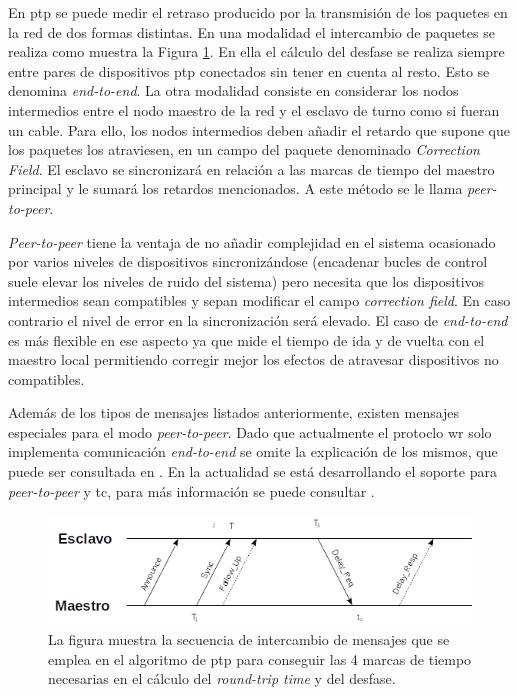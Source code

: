 En \gls{ptp} se puede medir el retraso producido por la transmisión de los 
paquetes en la red de dos formas distintas. En una modalidad el intercambio de 
paquetes se realiza como muestra la Figura \ref{fig:ptpts}. En ella el cálculo 
del desfase se realiza siempre entre pares de 
dispositivos \gls{ptp} conectados sin tener en cuenta al resto. Esto se 
denomina \textit{end-to-end}.
La otra modalidad consiste en considerar los nodos intermedios entre el nodo 
maestro de la red y el esclavo de turno como si fueran un cable. Para ello, 
los nodos intermedios deben añadir el retardo que supone que los paquetes 
los atraviesen, en un campo del paquete denominado \textit{Correction 
Field}. El esclavo se sincronizará en relación a las marcas de tiempo del 
maestro principal y le sumará los retardos mencionados. A este método se le 
llama \textit{peer-to-peer}.

\textit{Peer-to-peer} tiene la ventaja de no añadir complejidad en el sistema 
ocasionado por varios niveles de dispositivos sincronizándose (encadenar bucles 
de control suele elevar los niveles de ruido del sistema) pero necesita que los 
dispositivos intermedios sean compatibles y sepan modificar el campo 
\textit{correction field}. En caso contrario el nivel de error en la 
sincronización será elevado. El caso de \textit{end-to-end} es más flexible en 
ese aspecto ya que mide el tiempo de ida y de vuelta con el maestro local 
permitiendo corregir mejor los efectos de atravesar dispositivos no compatibles.

Además de los tipos de mensajes listados anteriormente, existen mensajes 
especiales para el modo \textit{peer-to-peer}. Dado que actualmente el protoclo 
\gls{wr} solo implementa comunicación \textit{end-to-end} se omite la 
explicación de los mismos, que puede ser consultada en \cite{IEEE1588-2008}. En 
la actualidad se está desarrollando el soporte para \textit{peer-to-peer} y 
\gls{tc}, para más información se puede consultar .

\begin{figure}
	\centering
	\includegraphics[width=0.7\linewidth]{imagenes/ptp_ts}
	\caption[Intercambio de mensajes para el algoritmo de \acrshort{ptp}]{La 
	figura muestra la secuencia de intercambio de mensajes 
	que se emplea en el algoritmo de \gls{ptp} para conseguir las 4 marcas de 
	tiempo necesarias en el cálculo del \textit{round-trip time} y del desfase.}
	\label{fig:ptpts}
\end{figure}

